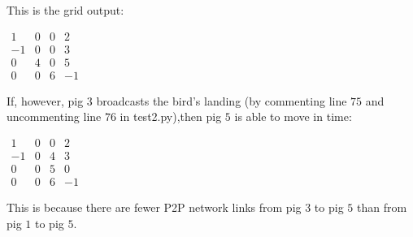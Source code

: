 \documentclass[]{article}
\begin{document}
This is the grid output:

$\begin{array}{cccc}
1 & 0 & 0 & 2 \\
-1 & 0 & 0 & 3 \\
0 & 4 & 0 & 5 \\
0 & 0 & 6 & -1
\end{array}$
 
If, however, pig $3$ broadcasts the bird's landing (by commenting line $75$ and uncommenting line $76$ in test2.py),then pig $5$ is able to move in time:

$\begin{array}{cccc}
1 & 0 & 0 & 2 \\
-1 & 0 & 4 & 3 \\
0 & 0 & 5 & 0 \\
0 & 0 & 6 & -1
\end{array}$
 
This is because there are fewer P2P network links from pig $3$ to pig $5$ than from pig $1$ to pig $5$.
\end{document}
